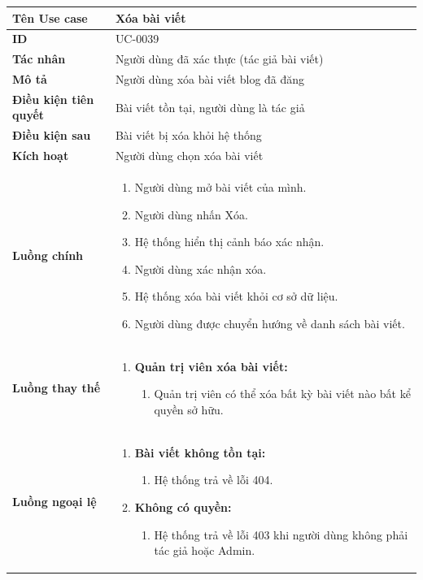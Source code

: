 {
\renewcommand{\arraystretch}{1.5}

\begin{tabularx}{\textwidth}{|>{\raggedright\arraybackslash}X|>{\raggedright\arraybackslash}X|}
\hline
\textbf{Tên Use case} & Xóa bài viết \\
\hline
\textbf{ID} & UC-0039 \\
\hline
\textbf{Tác nhân} & Người dùng đã xác thực (tác giả bài viết) \\
\hline
\textbf{Mô tả} & Người dùng xóa bài viết blog đã đăng \\
\hline
\textbf{Điều kiện tiên quyết} & Bài viết tồn tại, người dùng là tác giả \\
\hline
\textbf{Điều kiện sau} & Bài viết bị xóa khỏi hệ thống \\
\hline
\textbf{Kích hoạt} & Người dùng chọn xóa bài viết \\
\hline
\textbf{Luồng chính} &
\begin{enumerate}
    \item Người dùng mở bài viết của mình.
    \item Người dùng nhấn Xóa.
    \item Hệ thống hiển thị cảnh báo xác nhận.
    \item Người dùng xác nhận xóa.
    \item Hệ thống xóa bài viết khỏi cơ sở dữ liệu.
    \item Người dùng được chuyển hướng về danh sách bài viết.
\end{enumerate} \\
\hline
\textbf{Luồng thay thế} &
\begin{enumerate}
    \item \textbf{Quản trị viên xóa bài viết:}
    \begin{enumerate}
        \item[1A.] Quản trị viên có thể xóa bất kỳ bài viết nào bất kể quyền sở hữu.
    \end{enumerate}
\end{enumerate} \\
\hline
\textbf{Luồng ngoại lệ} &
\begin{enumerate}
    \item \textbf{Bài viết không tồn tại:}
    \begin{enumerate}
        \item[1Err.] Hệ thống trả về lỗi 404.
    \end{enumerate}
    \item \textbf{Không có quyền:}
    \begin{enumerate}
        \item[1Err2.] Hệ thống trả về lỗi 403 khi người dùng không phải tác giả hoặc Admin.
    \end{enumerate}
\end{enumerate} \\
\hline
\end{tabularx}
}
